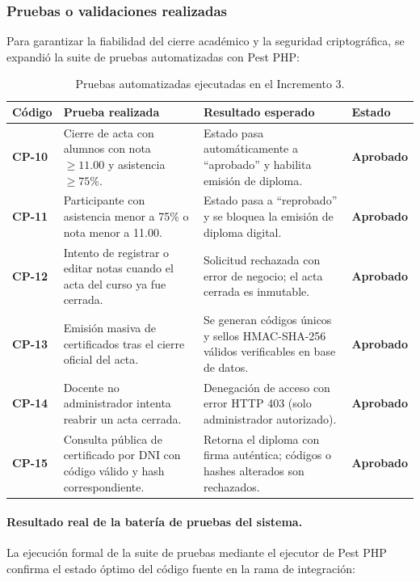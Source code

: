 \subsubsection{Pruebas o validaciones realizadas}
Para garantizar la fiabilidad del cierre académico y la seguridad criptográfica, se expandió la suite de pruebas automatizadas con Pest PHP:

\begin{table}[H]
\centering
\small
\begin{tabularx}{\textwidth}{P{1.8cm} P{4.8cm} P{4.5cm} Y}
\toprule
\textbf{Código} & \textbf{Prueba realizada} & \textbf{Resultado esperado} & \textbf{Estado} \\
\midrule
\textbf{CP-10} & Cierre de acta con alumnos con nota $\ge 11.00$ y asistencia $\ge 75\%$. & Estado pasa automáticamente a \enquote{aprobado} y habilita emisión de diploma. & \textbf{Aprobado} \\
\addlinespace
\textbf{CP-11} & Participante con asistencia menor a 75\% o nota menor a 11.00. & Estado pasa a \enquote{reprobado} y se bloquea la emisión de diploma digital. & \textbf{Aprobado} \\
\addlinespace
\textbf{CP-12} & Intento de registrar o editar notas cuando el acta del curso ya fue cerrada. & Solicitud rechazada con error de negocio; el acta cerrada es inmutable. & \textbf{Aprobado} \\
\addlinespace
\textbf{CP-13} & Emisión masiva de certificados tras el cierre oficial del acta. & Se generan códigos únicos y sellos HMAC-SHA-256 válidos verificables en base de datos. & \textbf{Aprobado} \\
\addlinespace
\textbf{CP-14} & Docente no administrador intenta reabrir un acta cerrada. & Denegación de acceso con error HTTP 403 (solo administrador autorizado). & \textbf{Aprobado} \\
\addlinespace
\textbf{CP-15} & Consulta pública de certificado por DNI con código válido y hash correspondiente. & Retorna el diploma con firma auténtica; códigos o hashes alterados son rechazados. & \textbf{Aprobado} \\
\bottomrule
\end{tabularx}
\caption{Pruebas automatizadas ejecutadas en el Incremento 3.}
\label{tab:pruebas_inc3}
\end{table}

\paragraph{Resultado real de la batería de pruebas del sistema.}
La ejecución formal de la suite de pruebas mediante el ejecutor de Pest PHP confirma el estado óptimo del código fuente en la rama de integración:

